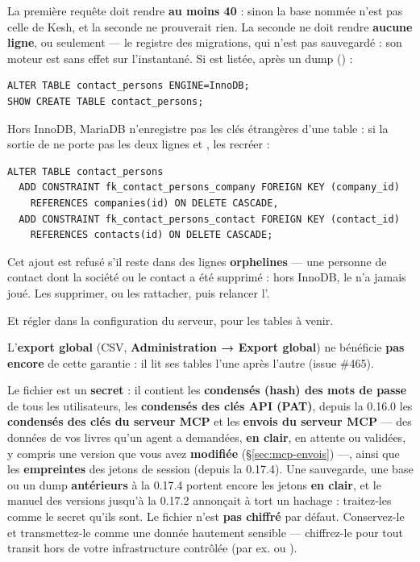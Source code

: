 \documentclass[a4paper,11pt,oneside]{article}
\begin{document}
La première requête doit rendre \textbf{au moins 40} : sinon la base nommée n'est pas celle de Kesh, et la seconde ne prouverait rien. La seconde ne doit rendre \textbf{aucune ligne}, ou seulement  --- le registre des migrations, qui n'est pas sauvegardé : son moteur est sans effet sur l'instantané. Si  est listée, après un dump () :

\begin{lstlisting}
ALTER TABLE contact_persons ENGINE=InnoDB;
SHOW CREATE TABLE contact_persons;
\end{lstlisting}

Hors InnoDB, MariaDB n'enregistre pas les clés étrangères d'une table : si la sortie de  ne porte pas les deux lignes  et , les recréer :

\begin{lstlisting}
ALTER TABLE contact_persons
  ADD CONSTRAINT fk_contact_persons_company FOREIGN KEY (company_id)
    REFERENCES companies(id) ON DELETE CASCADE,
  ADD CONSTRAINT fk_contact_persons_contact FOREIGN KEY (contact_id)
    REFERENCES contacts(id) ON DELETE CASCADE;
\end{lstlisting}

Cet ajout est refusé s'il reste dans  des lignes \textbf{orphelines} --- une personne de contact dont la société ou le contact a été supprimé : hors InnoDB, le  n'a jamais joué. Les supprimer, ou les rattacher, puis relancer l'.

Et régler  dans la configuration du serveur, pour les tables à venir.

L'\textbf{export global} (CSV, \textbf{Administration → Export global}) ne bénéficie \textbf{pas encore} de cette garantie : il lit ses tables l'une après l'autre (issue \#465).

\begin{keshwarning}
Le fichier  est un \textbf{secret} : il contient les \textbf{condensés (hash) des mots de passe} de tous les utilisateurs, les \textbf{condensés des clés API (PAT)}, depuis la 0.16.0 les \textbf{condensés des clés du serveur MCP} et les \textbf{envois du serveur MCP} --- des données de vos livres qu'un agent a demandées, \textbf{en clair}, en attente ou validées, y compris une version que vous avez \textbf{modifiée} (\S\ref{sec:mcp-envois}) ---, ainsi que les \textbf{empreintes} des jetons de session (depuis la 0.17.4). Une sauvegarde, une base ou un dump \textbf{antérieurs} à la 0.17.4 portent encore les jetons \textbf{en clair}, et le manuel des versions jusqu'à la 0.17.2 annonçait à tort un hachage : traitez-les comme le secret qu'ils sont. Le fichier n'est \textbf{pas chiffré} par défaut. Conservez-le et transmettez-le comme une donnée hautement sensible — chiffrez-le pour tout transit hors de votre infrastructure contrôlée (par ex.  ou ).
\end{keshwarning}
\end{document}
